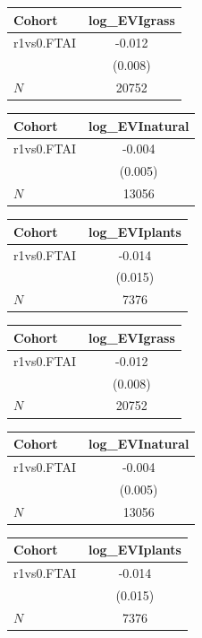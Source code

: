 {
\def\sym#1{\ifmmode^{#1}\else\(^{#1}\)\fi}
\begin{tabular}{l*{1}{c}}
\toprule
Cohort    &log\_EVIgrass   \\
\midrule
r1vs0.FTAI&   -0.012   \\
          &  (0.008)   \\
\midrule
\(N\)     &    20752   \\
\bottomrule
\end{tabular}
}
{
\def\sym#1{\ifmmode^{#1}\else\(^{#1}\)\fi}
\begin{tabular}{l*{1}{c}}
\toprule
Cohort    &log\_EVInatural   \\
\midrule
r1vs0.FTAI&   -0.004   \\
          &  (0.005)   \\
\midrule
\(N\)     &    13056   \\
\bottomrule
\end{tabular}
}
{
\def\sym#1{\ifmmode^{#1}\else\(^{#1}\)\fi}
\begin{tabular}{l*{1}{c}}
\toprule
Cohort    &log\_EVIplants   \\
\midrule
r1vs0.FTAI&   -0.014   \\
          &  (0.015)   \\
\midrule
\(N\)     &     7376   \\
\bottomrule
\end{tabular}
}
{
\def\sym#1{\ifmmode^{#1}\else\(^{#1}\)\fi}
\begin{tabular}{l*{1}{c}}
\toprule
Cohort    &log\_EVIgrass   \\
\midrule
r1vs0.FTAI&   -0.012   \\
          &  (0.008)   \\
\midrule
\(N\)     &    20752   \\
\bottomrule
\end{tabular}
}
{
\def\sym#1{\ifmmode^{#1}\else\(^{#1}\)\fi}
\begin{tabular}{l*{1}{c}}
\toprule
Cohort    &log\_EVInatural   \\
\midrule
r1vs0.FTAI&   -0.004   \\
          &  (0.005)   \\
\midrule
\(N\)     &    13056   \\
\bottomrule
\end{tabular}
}
{
\def\sym#1{\ifmmode^{#1}\else\(^{#1}\)\fi}
\begin{tabular}{l*{1}{c}}
\toprule
Cohort    &log\_EVIplants   \\
\midrule
r1vs0.FTAI&   -0.014   \\
          &  (0.015)   \\
\midrule
\(N\)     &     7376   \\
\bottomrule
\end{tabular}
}
